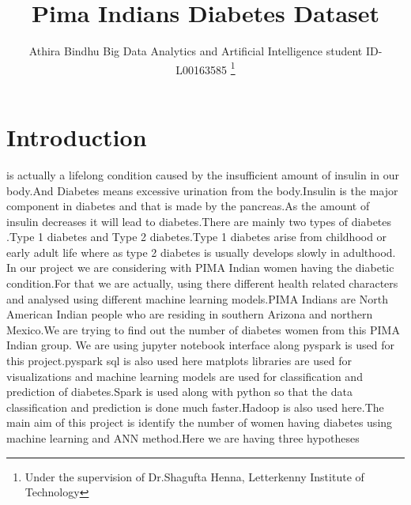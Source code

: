 \documentclass[journal,twoside,web]{ieeecolor}
\begin{document}
\title{Pima Indians Diabetes Dataset}
\author{Athira Bindhu Big Data Analytics and Artificial Intelligence student ID-L00163585
\thanks{Under the supervision of Dr.Shagufta Henna, Letterkenny Institute of Technology}
}


\maketitle

\section{Introduction}
\label{sec:introduction}
 is actually a lifelong condition caused by the insufficient amount of insulin in our body.And Diabetes means  excessive urination from the body.Insulin is the major component in diabetes and that is made by the pancreas.As the amount of insulin decreases it will lead to diabetes.There are mainly two types of diabetes .Type 1 diabetes  and Type 2 diabetes.Type 1 diabetes arise from childhood or early adult life where as type 2 diabetes is usually develops slowly in adulthood. In our project we are considering with PIMA Indian women having the diabetic condition.\cite{I1}For that we are actually, using there different health related characters and analysed using different machine learning models.PIMA Indians are North American Indian people who are residing in southern Arizona and northern Mexico.We are trying to find out the number of diabetes women from this PIMA Indian group. We are using jupyter notebook interface along pyspark is used for this project.pyspark sql is also used here matplots libraries are used for visualizations and machine learning models are used for classification and prediction of diabetes.Spark is used along with python so that the data classification and prediction is done much faster.Hadoop is also used here.The main aim of this project is identify the number of women having diabetes using machine learning and ANN method.Here we are having three hypotheses
\end{document}

